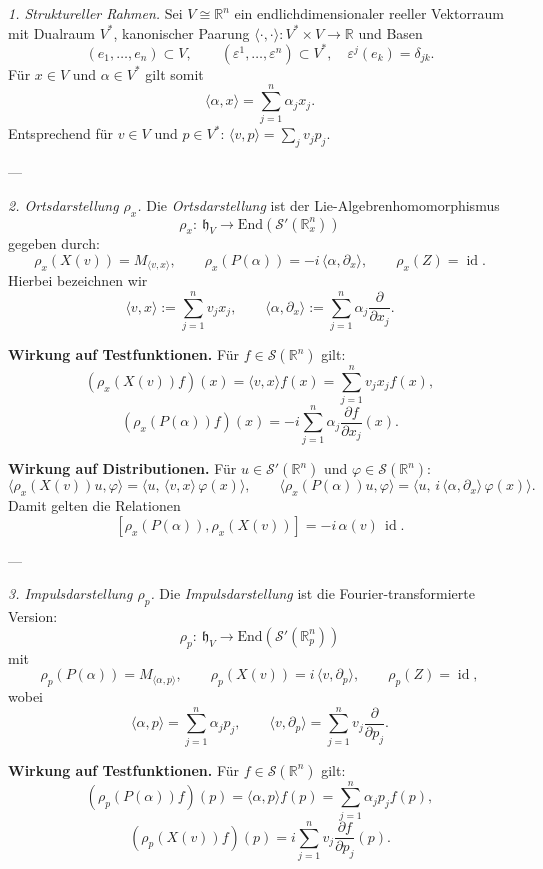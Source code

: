 \documentclass[10pt, letterpaper]{article}
\newcommand{\id}{\operatorname{id}}
\newcommand{\R}{\mathbb{R}}
\newcommand{\End}{\mathrm{End}}
\begin{document}
\emph{1. Struktureller Rahmen.}
Sei $V\cong\R^n$ ein endlichdimensionaler reeller Vektorraum mit Dualraum $V^\ast$,
kanonischer Paarung $\langle\cdot,\cdot\rangle : V^\ast\times V \to \R$ und Basen
\[
(e_1,\dots,e_n)\subset V,\qquad (\varepsilon^1,\dots,\varepsilon^n)\subset V^\ast,
\quad \varepsilon^j(e_k)=\delta_{jk}.
\]
Für $x\in V$ und $\alpha\in V^\ast$ gilt somit
\[
\langle \alpha, x\rangle = \sum_{j=1}^n \alpha_j x_j.
\]
Entsprechend für $v\in V$ und $p\in V^\ast$:
\(\langle v,p\rangle = \sum_j v_j p_j.\)

---

\emph{2. Ortsdarstellung $\rho_x$.}
Die \emph{Ortsdarstellung} ist der Lie-Algebrenhomomorphismus
\[
\rho_x:\ \mathfrak{h}_V \longrightarrow \End(\mathcal{S}'(\R^n_x))
\]
gegeben durch:
\[
\rho_x(X(v)) = M_{\langle v,x\rangle},\qquad
\rho_x(P(\alpha)) = -i\,\langle \alpha,\partial_x\rangle,\qquad
\rho_x(Z)=\id.
\]
Hierbei bezeichnen wir
\[
\langle v,x\rangle := \sum_{j=1}^n v_j x_j,
\qquad
\langle \alpha,\partial_x\rangle := \sum_{j=1}^n \alpha_j \frac{\partial}{\partial x_j}.
\]

\textbf{Wirkung auf Testfunktionen.}
Für $f\in\mathcal{S}(\R^n)$ gilt:
\[
(\rho_x(X(v))f)(x)=\langle v,x\rangle f(x)
=\sum_{j=1}^n v_j x_j f(x),
\]
\[
(\rho_x(P(\alpha))f)(x)
=-i\sum_{j=1}^n \alpha_j\frac{\partial f}{\partial x_j}(x).
\]

\textbf{Wirkung auf Distributionen.}
Für $u\in\mathcal{S}'(\R^n)$ und $\varphi\in\mathcal{S}(\R^n)$:
\[
\langle \rho_x(X(v))u,\varphi\rangle
=\langle u,\,\langle v,x\rangle\,\varphi(x)\rangle,
\qquad
\langle \rho_x(P(\alpha))u,\varphi\rangle
=\langle u,\, i\,\langle \alpha,\partial_x\rangle\,\varphi(x)\rangle.
\]
Damit gelten die Relationen
\[
[\rho_x(P(\alpha)),\rho_x(X(v))]=-i\,\alpha(v)\,\id.
\]

---

\emph{3. Impulsdarstellung $\rho_p$.}
Die \emph{Impulsdarstellung} ist die Fourier-transformierte Version:
\[
\rho_p:\ \mathfrak{h}_V \longrightarrow \End(\mathcal{S}'(\R^n_p))
\]
mit
\[
\rho_p(P(\alpha)) = M_{\langle \alpha,p\rangle},\qquad
\rho_p(X(v)) = i\,\langle v,\partial_p\rangle,\qquad
\rho_p(Z)=\id,
\]
wobei
\[
\langle \alpha,p\rangle = \sum_{j=1}^n \alpha_j p_j,
\qquad
\langle v,\partial_p\rangle = \sum_{j=1}^n v_j \frac{\partial}{\partial p_j}.
\]

\textbf{Wirkung auf Testfunktionen.}
Für $f\in\mathcal{S}(\R^n)$ gilt:
\[
(\rho_p(P(\alpha))f)(p)=\langle \alpha,p\rangle f(p)
=\sum_{j=1}^n \alpha_j p_j f(p),
\]
\[
(\rho_p(X(v))f)(p)=i\sum_{j=1}^n v_j \frac{\partial f}{\partial p_j}(p).
\]
\end{document}
